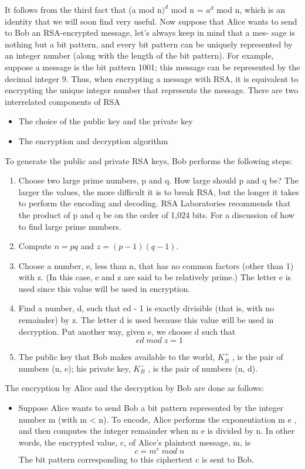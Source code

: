 \documentclass{report}
\begin{document}
{{{{\Large{It follows from the third fact that (a mod n$)^d$ mod n = $a^d$ mod n, which is an identity
that we will soon find very useful.
Now suppose that Alice wants to send to Bob an RSA-encrypted message, let’s always keep in mind that a mes-
sage is nothing but a bit pattern, and every bit pattern can be uniquely represented by
an integer number (along with the length of the bit pattern). For example, suppose
a message is the bit pattern 1001; this message can be represented by the decimal
integer 9. Thus, when encrypting a message with RSA, it is equivalent to encrypting
the unique integer number that represents the message.
There are two interrelated components of RSA
\begin{itemize}
\item{The choice of the public key and the private key}
\item{The encryption and decryption algorithm}
\end{itemize}
To generate the public and private RSA keys, Bob performs the following steps:
\begin{enumerate}
\item{Choose two large prime numbers, p and q. How large should p and q be? The
larger the values, the more difficult it is to break RSA, but the longer it takes to perform the encoding and decoding. RSA Laboratories recommends that
the product of p and q be on the order of 1,024 bits. For a discussion of how to
find large prime numbers.}
\item{Compute $n = pq$ and $z = (p - 1)(q - 1)$.}
\item{Choose a number, e, less than n, that has no common factors (other than 1)
with z. (In this case, e and z are said to be relatively prime.) The letter e is used
since this value will be used in encryption.}
\item{Find a number, d, such that ed - 1 is exactly divisible (that is, with no remainder)
by z. The letter d is used because this value will be used in decryption. Put another
way, given e, we choose d such that
$$ed\;mod\;z = 1$$}
\item{The public key that Bob makes available to the world, $K_B^+$ , is the pair of numbers
(n, e); his private key, $K_B^-$ , is the pair of numbers (n, d).}
\end{enumerate}

The encryption by Alice and the decryption by Bob are done as follows:
\begin{itemize}
\item{Suppose Alice wants to send Bob a bit pattern represented by the integer number
m (with m < n). To encode, Alice performs the exponentiation m e , and then
computes the integer remainder when m e is divided by n. In other words, the
encrypted value, c, of Alice’s plaintext message, m, is
$$c=m^e\;mod\;n$$
The bit pattern corresponding to this ciphertext c is sent to Bob.}


\end{itemize}}}}}}
\end{document}
